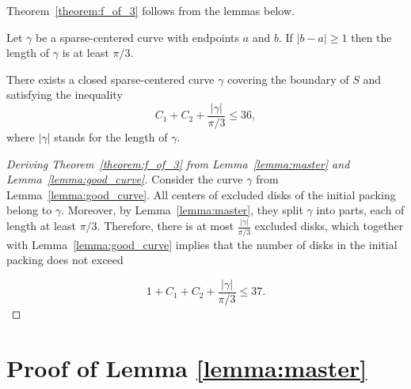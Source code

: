 



Theorem~\ref{theorem:f_of_3} follows from the lemmas below.

\begin{lemma}
Let $\gamma$ be a sparse-centered curve with endpoints $a$ and $b$. If $|b - a|\geq 1$ then the length of $\gamma$ is at least $\pi/3$.
\label{lemma:master}
\end{lemma}

\begin{lemma}
\label{lemma:good_curve}
There exists a closed sparse-centered curve $\gamma$ covering the boundary of $S$ and satisfying the inequality
$$C_1 + C_2 + \frac{|\gamma|}{\pi/3} \leq 36,$$
where $|\gamma|$ stands for the length of $\gamma$.
\end{lemma}

\begin{proof}[Deriving Theorem~\ref{theorem:f_of_3} from Lemma~\ref{lemma:master} and Lemma~\ref{lemma:good_curve}]
Consider the curve $\gamma$ from Lemma~\ref{lemma:good_curve}. All centers of excluded disks of the initial packing belong to $\gamma$. Moreover, by Lemma~\ref{lemma:master}, they split $\gamma$ into parts, each of length at least $\pi/3$. Therefore, there is at most $\frac{|\gamma|}{\pi/3}$ excluded disks, which together with Lemma~\ref{lemma:good_curve} implies that the number of disks in the initial packing does not exceed

$$1 + C_1 + C_2 + \frac{|\gamma|}{\pi/3} \leq 37.$$
\end{proof}

\section{Proof of Lemma \ref{lemma:master}}

